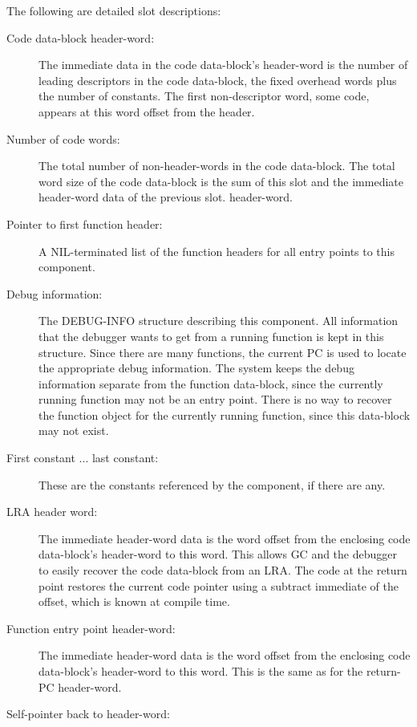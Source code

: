 The following are detailed slot descriptions:
\begin{description}
   \item[Code data-block header-word:]
      The immediate data in the code data-block's header-word is the number of
      leading descriptors in the code data-block, the fixed overhead words plus
      the number of constants.  The first non-descriptor word, some code,
      appears at this word offset from the header.
   \item[Number of code words:]
      The total number of non-header-words in the code data-block.  The total
      word size of the code data-block is the sum of this slot and the
      immediate header-word data of the previous slot.
      header-word.
   \item[Pointer to first function header:]
      A NIL-terminated list of the function headers for all entry points to
      this component.
   \item[Debug information:]
      The DEBUG-INFO structure describing this component.  All information that
      the debugger wants to get from a running function is kept in this
      structure.  Since there are many functions, the current PC is used to
      locate the appropriate debug information.  The system keeps the debug
      information separate from the function data-block, since the currently
      running function may not be an entry point.  There is no way to recover
      the function object for the currently running function, since this
      data-block may not exist.
   \item[First constant ... last constant:]
      These are the constants referenced by the component, if there are any.
\vspace{1ex}
   \item[LRA header word:]
      The immediate header-word data is the word offset from the enclosing code
      data-block's header-word to this word.  This allows GC and the debugger
      to easily recover the code data-block from an LRA.  The code at the
      return point restores the current code pointer using a subtract immediate
      of the offset, which is known at compile time.
\vspace{1ex}
   \item[Function entry point header-word:]
      The immediate header-word data is the word offset from the enclosing code
      data-block's header-word to this word.  This is the same as for the
      return-PC header-word.
   \item[Self-pointer back to header-word:]

\end{description}
